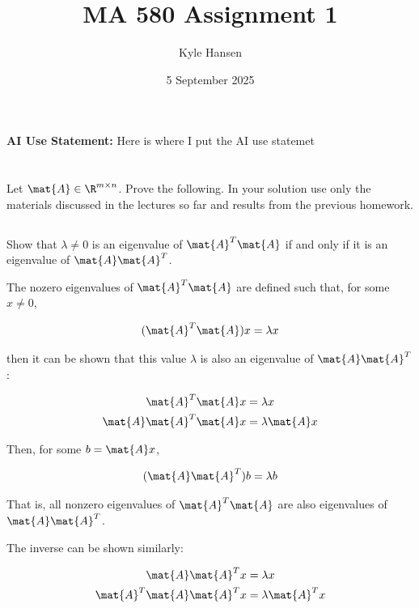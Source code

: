 \documentclass{template}
\title{MA 580 Assignment 1}
\author{Kyle Hansen}
\date{5 September 2025}
\begin{document}
\maketitle

\textbf{AI Use Statement: }Here is where I put the AI use statemet

\section{}

Let $\mat{A} \in \R^{m \times n}$. 
Prove the following. 
In your solution 
use only the materials discussed in the lectures so far and results 
from the previous homework.

\subsection{}
Show that $\lambda \neq 0$ is an eigenvalue of $\mat{A}^T \mat{A}$ if and 
only if it is an eigenvalue of $\mat{A}\mat{A}^T$.

The nozero eigenvalues of $\mat{A}^T \mat{A}$ are defined such that, for some $x \neq 0$,

\begin{equation}
    (\mat{A}^T \mat{A})x = \lambda x
\end{equation}

then it can be shown that this value $\lambda$ is also an eigenvalue of $\mat{A}\mat{A}^T $:

\begin{equation}
    \begin{align}
    \mat{A}^T \mat{A}x &= \lambda x\\
    \mat{A}\mat{A}^T \mat{A}x &= \lambda \mat{A} x\\
    \end{align}
\end{equation}

Then, for some $b = \mat{A}x$, 

\begin{equation}
    (\mat{A}\mat{A}^T )b = \lambda b
\end{equation}

That is, all nonzero eigenvalues of $\mat{A}^T \mat{A}$ are also eigenvalues of $\mat{A}\mat{A}^T$.

The inverse can be shown similarly:

\begin{equation}
    \begin{align}
    \mat{A}\mat{A}^T x &= \lambda x\\
    \mat{A}^T \mat{A}\mat{A}^Tx &= \lambda \mat{A}^T x\\
    \end{align}
\end{equation}
\end{document}
